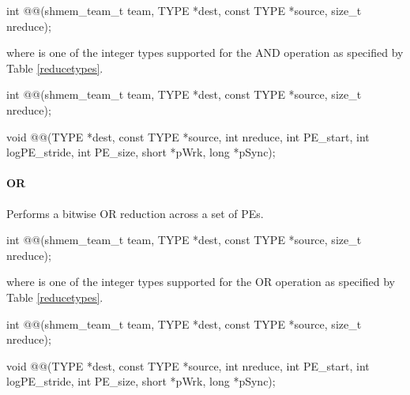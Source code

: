 \begin{apidefinition}
{\color{Green}
\begin{C11synopsis}
int @@(shmem_team_t team, TYPE *dest, const TYPE *source, size_t nreduce);
\end{C11synopsis}
where \TYPE{} is one of the integer types supported for the AND operation as specified by Table \ref{reducetypes}.
}

\begin{Csynopsis}
\end{Csynopsis}

{\color{Green}
\begin{CsynopsisCol}
int @@(shmem_team_t team, TYPE *dest, const TYPE *source, size_t nreduce);
\end{CsynopsisCol}
}
\begin{DeprecateBlock}
\begin{CsynopsisCol}
void @@(TYPE *dest, const TYPE *source, int nreduce, int PE_start, int logPE_stride, int PE_size, short *pWrk, long *pSync);
\end{CsynopsisCol}
\end{DeprecateBlock}

\paragraph{OR}
Performs a bitwise OR reduction across a set of \acp{PE}.\newline

{\color{Green}
\begin{C11synopsis}
int @@(shmem_team_t team, TYPE *dest, const TYPE *source, size_t nreduce);
\end{C11synopsis}
where \TYPE{} is one of the integer types supported for the OR operation as specified by Table \ref{reducetypes}.
}

\begin{Csynopsis}
\end{Csynopsis}
{\color{Green}
\begin{CsynopsisCol}
int @@(shmem_team_t team, TYPE *dest, const TYPE *source, size_t nreduce);
\end{CsynopsisCol}
}
\begin{DeprecateBlock}
\begin{CsynopsisCol}
void @@(TYPE *dest, const TYPE *source, int nreduce, int PE_start, int logPE_stride, int PE_size, short *pWrk, long *pSync);
\end{CsynopsisCol}
\end{DeprecateBlock}


\end{apidefinition}
